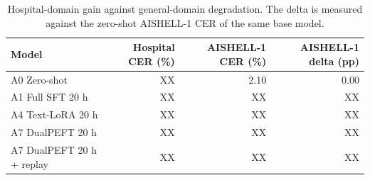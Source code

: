 \begin{table}[t]
\centering
\caption{Hospital-domain gain against general-domain degradation. The delta is measured against the zero-shot AISHELL-1 CER of the same base model.}
\label{tab:table5_forgetting}
\begin{tabular}{lrrr}
\toprule
Model & Hospital CER (\%) & AISHELL-1 CER (\%) & AISHELL-1 delta (pp) \\
\midrule
A0 Zero-shot & XX & 2.10 & 0.00 \\
A1 Full SFT 20 h & XX & XX & XX \\
A4 Text-LoRA 20 h & XX & XX & XX \\
A7 DualPEFT 20 h & XX & XX & XX \\
A7 DualPEFT 20 h + replay & XX & XX & XX \\
\bottomrule
\end{tabular}
\end{table}

